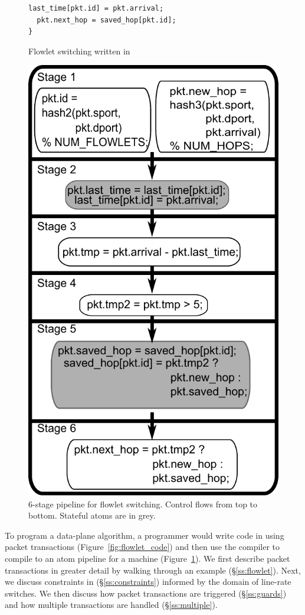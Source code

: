 \begin{figure}[!t]
\begin{minipage}{0.5\textwidth}
\begin{small}
\begin{lstlisting}[style=customc]
  last_time[pkt.id] = pkt.arrival;
  pkt.next_hop = saved_hop[pkt.id];
}
\end{lstlisting}
\end{small}
\caption{Flowlet switching written in \pktlanguage}
\label{fig:flowlet_code}
\end{minipage}
%
\vrule\quad
%
\begin{minipage}{0.4\textwidth}
\includegraphics[width=0.8\columnwidth]{pipe.pdf}
\caption{6-stage \absmachine pipeline for flowlet
switching.  Control flows from top to bottom. Stateful atoms are in grey.}
\label{fig:flowlet_pipeline}
\end{minipage}
\end{figure}

To program a data-plane algorithm, a programmer would write code in
\pktlanguage using packet transactions (Figure~\ref{fig:flowlet_code}) and then use
the \pktlanguage compiler to compile to an atom pipeline for a \absmachine
machine (Figure~\ref{fig:flowlet_pipeline}). We first describe packet
transactions in greater detail by walking through an example
(\S\ref{ss:flowlet}). Next, we discuss constraints in \pktlanguage
(\S\ref{ss:constraints}) informed by the domain of line-rate switches. We then
discuss how packet transactions are triggered (\S\ref{ss:guards}) and how
multiple transactions are handled (\S\ref{ss:multiple}).


